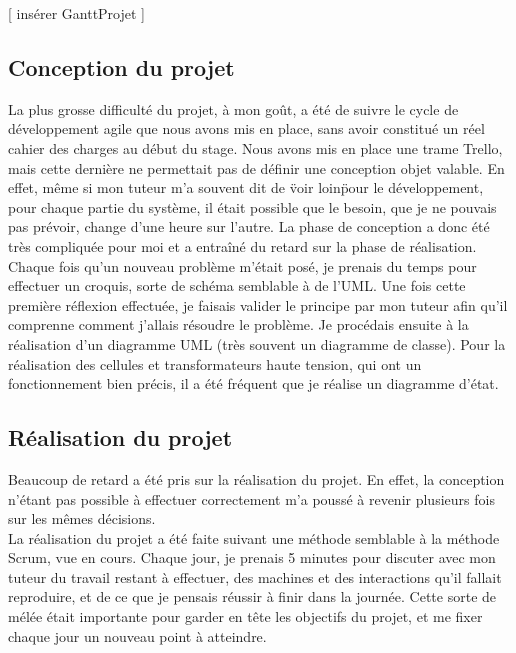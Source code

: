 \documentclass[a4paper]{article}
\begin{document}
     [ insérer GanttProjet ]   

    \subsection{Conception du projet}

    La plus grosse difficulté du projet, à mon goût, a été de suivre le cycle de développement agile que nous avons mis en place, sans avoir constitué un réel cahier des charges au début du stage. Nous avons mis en place une trame Trello, mais cette dernière ne permettait pas de définir une conception objet valable. En effet, même si mon tuteur m'a souvent dit de \"voir loin\" pour le développement, pour chaque partie du système, il était possible que le besoin, que je ne pouvais pas prévoir, change d'une heure sur l'autre. La phase de conception a donc été très compliquée pour moi et a entraîné du retard sur la phase de réalisation. \\
    
    Chaque fois qu'un nouveau problème m'était posé, je prenais du temps pour effectuer un croquis, sorte de schéma semblable à de l'UML. Une fois cette première réflexion effectuée, je faisais valider le principe par mon tuteur afin qu'il comprenne comment j'allais résoudre le problème. Je procédais ensuite à la réalisation d'un diagramme UML (très souvent un diagramme de classe). Pour la réalisation des cellules et transformateurs haute tension, qui ont un fonctionnement bien précis, il a été fréquent que je réalise un diagramme d'état. \\ 

    \subsection{Réalisation du projet}

    Beaucoup de retard a été pris sur la réalisation du projet. En effet, la conception n'étant pas possible à effectuer correctement m'a poussé à revenir plusieurs fois sur les mêmes décisions. \\

    La réalisation du projet a été faite suivant une méthode semblable à la méthode Scrum, vue en cours. Chaque jour, je prenais 5 minutes pour discuter avec mon tuteur du travail restant à effectuer, des machines et des interactions qu'il fallait reproduire, et de ce que je pensais réussir à finir dans la journée. Cette sorte de mélée était importante pour garder en tête les objectifs du projet, et me fixer chaque jour un nouveau point à atteindre. \\
\end{document}
